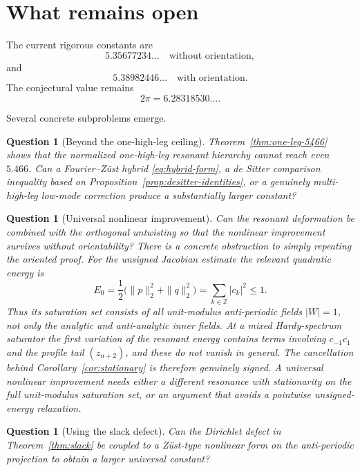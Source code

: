 \documentclass[11pt]{article}
\newtheorem{question}[theorem]{Question}
\begin{document}
\section{What remains open}

The current rigorous constants are
\[
        5.35677234\ldots
        \quad\text{without orientation},
\]
and
\[
        5.38982446\ldots
        \quad\text{with orientation}.
\]
The conjectural value remains
\[
        2\pi=6.28318530\ldots.
\]

Several concrete subproblems emerge.

\begin{question}[Beyond the one-high-leg ceiling]
Theorem~\ref{thm:one-leg-5466} shows that the normalized one-high-leg resonant
hierarchy cannot reach even $5.466$.  Can a Fourier--Z\"ust hybrid
\eqref{eq:hybrid-form}, a de Sitter comparison inequality based on
Proposition~\ref{prop:desitter-identities}, or a genuinely multi-high-leg
low-mode correction produce a substantially larger constant?
\end{question}

\begin{question}[Universal nonlinear improvement]
Can the resonant deformation be combined with the orthogonal untwisting so
that the nonlinear improvement survives without orientability?  There is a
concrete obstruction to simply repeating the oriented proof.  For the
unsigned Jacobian estimate the relevant quadratic energy is
\[
 E_0=\frac12\bigl(\|p\|_2^2+\|q\|_2^2\bigr)
    =\sum_{k\in\mathbb Z}|c_k|^2\le1.
\]
Thus its saturation set consists of all unit-modulus anti-periodic fields
$|W|=1$, not only the analytic and anti-analytic inner fields.  At a mixed
Hardy-spectrum saturator the first variation of the resonant energy contains
terms involving $c_{-1}\overline{c_1}$ and the profile tail
$(z_{n+2})$, and these do not vanish in general.  The cancellation behind
Corollary~\ref{cor:stationary} is therefore genuinely signed.  A universal
nonlinear improvement needs either a different resonance with stationarity
on the full unit-modulus saturation set, or an argument that avoids a
pointwise unsigned-energy relaxation.
\end{question}

\begin{question}[Using the slack defect]
Can the Dirichlet defect in Theorem~\ref{thm:slack} be coupled to a
Z\"ust-type nonlinear form on the anti-periodic projection to obtain a
larger universal constant?
\end{question}
\end{document}
